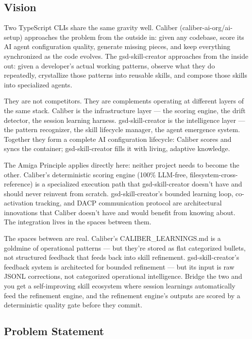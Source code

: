 \documentclass[11pt,letterpaper]{article}
\begin{document}
\subsection{Vision}

Two TypeScript CLIs share the same gravity well. Caliber (caliber-ai-org/ai-setup) approaches the problem from the outside in: given any codebase, score its AI agent configuration quality, generate missing pieces, and keep everything synchronized as the code evolves. The gsd-skill-creator approaches from the inside out: given a developer's actual working patterns, observe what they do repeatedly, crystallize those patterns into reusable skills, and compose those skills into specialized agents.

They are not competitors. They are complements operating at different layers of the same stack. Caliber is the infrastructure layer — the scoring engine, the drift detector, the session learning harness. gsd-skill-creator is the intelligence layer — the pattern recognizer, the skill lifecycle manager, the agent emergence system. Together they form a complete AI configuration lifecycle: Caliber scores and syncs the container; gsd-skill-creator fills it with living, adaptive knowledge.

The Amiga Principle applies directly here: neither project needs to become the other. Caliber's deterministic scoring engine (100\% LLM-free, filesystem-cross-reference) is a specialized execution path that gsd-skill-creator doesn't have and should never reinvent from scratch. gsd-skill-creator's bounded learning loop, co-activation tracking, and DACP communication protocol are architectural innovations that Caliber doesn't have and would benefit from knowing about. The integration lives in the spaces between them.

The spaces between are real. Caliber's CALIBER\_LEARNINGS.md is a goldmine of operational patterns — but they're stored as flat categorized bullets, not structured feedback that feeds back into skill refinement. gsd-skill-creator's feedback system is architected for bounded refinement — but its input is raw JSONL corrections, not categorized operational intelligence. Bridge the two and you get a self-improving skill ecosystem where session learnings automatically feed the refinement engine, and the refinement engine's outputs are scored by a deterministic quality gate before they commit.

\subsection{Problem Statement}
\end{document}
